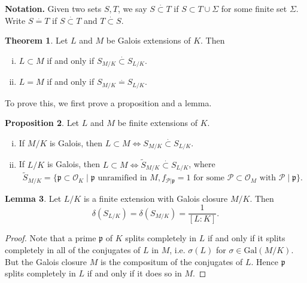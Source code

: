 \documentclass{article}
\theoremstyle{definition}
\newtheorem{theorem}{Theorem}[section]
\newtheorem{lemma}[theorem]{Lemma}
\newtheorem{prop}[theorem]{Proposition}
\begin{document}
\textbf{Notation.} Given two sets $S,T$, we say $S \stackrel{\cdot }{\subset} T$ if $S \subset T \cup \Sigma$ for some finite set $\Sigma$. Write $S \stackrel{\cdot }{=} T$ if $S \stackrel{\cdot }{\subset} T$ and $T \stackrel{\cdot }{\subset} S$.
\begin{theorem}\label{theorem3.15}
    Let $L$ and $M$ be Galois extensions of $K$. Then
    \begin{enumerate}[(i)]
        \item $L \subset M$ if and only if $S_{M/K} \stackrel{\cdot }{\subset } S_{L/K}$.
        \item $L=M$ if and only if $S_{M/K} \stackrel{\cdot }{=} S_{L/K}$.
    \end{enumerate}
\end{theorem}
To prove this, we first prove a proposition and a lemma.
\begin{prop}\label{prop3.16}
    Let $L$ and $M$ be finite extensions of $K$.
    \begin{enumerate}[(i)]
        \item If $M/K$ is Galois, then $L \subset M \iff S_{M/K} \stackrel{\cdot }{\subset } S_{L/K}$.
        \item If $L/K$ is Galois, then $L \subset M \iff \widetilde{S}_{M/K} \stackrel{\cdot }{\subset } S_{L/K}$, where \[
            \widetilde{S}_{M/K} = \{\mathfrak{p} \subset \mathcal{O}_K  \mid \mathfrak{p} \text{ unramified in }M, f_{\mathcal{P}|\mathfrak{p}}=1 \text{ for some }\mathcal{P} \subset \mathcal{O}_M \text{ with } \mathcal{P}\mid \mathfrak{p}\}.
        \]
    \end{enumerate}
\end{prop}
\begin{lemma}\label{lemma3.17}
    Let $L/K$ is a finite extension with Galois closure $M/K$. Then \[
    \delta(S_{L/K}) = \delta(S_{M/K}) = \frac{1}{[L:K]}. 
    \]
\end{lemma}
\begin{proof}
    Note that a prime $\mathfrak{p}$ of $K$ splits completely in $L$ if and only if it splits completely in all of the conjugates of $L$ in $M$, i.e. $\sigma(L)$ for $\sigma \in \text{Gal}(M/K)$. But the Galois closure $M$ is the compositum of the conjugates of $L$. Hence $\mathfrak{p}$ splits completely in $L$ if and only if it does so in $M$. 
\end{proof}
\end{document}
